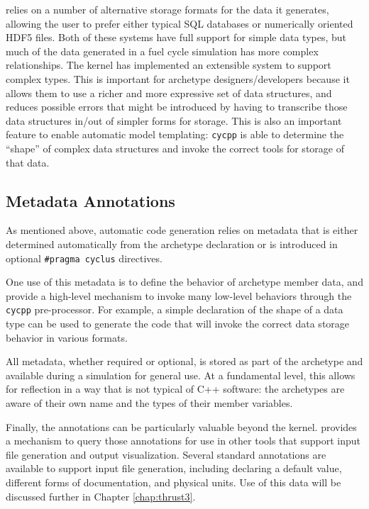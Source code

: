 \Cyclus relies on a number of alternative storage formats for the data it
generates, allowing the user to prefer either typical \gls{SQL} databases or
numerically oriented \gls{HDF5} files.  Both of these systems have full
support for simple data types, but much of the data generated in a fuel cycle
simulation has more complex relationships.  The \Cyclus kernel has implemented
an extensible system to support complex types.  This is important for
archetype designers/developers because it allows them to use a richer and more
expressive set of data structures, and reduces possible errors that might be
introduced by having to transcribe those data structures in/out of simpler
forms for storage.  This is also an important feature to enable automatic
model templating: \texttt{cycpp} is able to determine the ``shape'' of complex
data structures and invoke the correct tools for storage of that data.

\subsection{Metadata Annotations}\label{sec:metadata}

As mentioned above, automatic code generation relies on metadata that is
either determined automatically from the archetype declaration or is
introduced in optional \texttt{\#pragma cyclus} directives.

One use of this metadata is to define the behavior of archetype member data,
and provide a high-level mechanism to invoke many low-level behaviors through
the \texttt{cycpp} pre-processor.  For example, a simple declaration of the
shape of a data type can be used to generate the code that will invoke the
correct data storage behavior in various formats.

All metadata, whether required or optional, is stored as part of the archetype
and available during a \Cyclus simulation for general use.  At a fundamental
level, this allows for reflection in a way that is not typical of C++
software: the archetypes are aware of their own name and the types of their
member variables.

Finally, the annotations can be particularly valuable beyond the \Cyclus
kernel.  \Cyclus provides a mechanism to query those annotations for use in
other tools that support input file generation and output visualization.
Several standard annotations are available to support input file generation,
including declaring a default value, different forms of documentation, and
physical units.  Use of this data will be discussed further in Chapter
\ref{chap:thrust3}.

